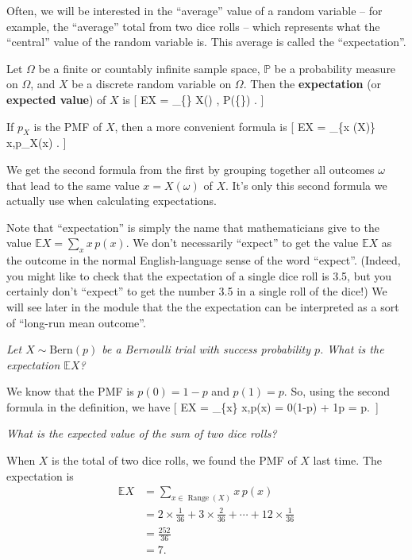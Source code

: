 \documentclass[
  letterpaper,
]{report}
\theoremstyle{definition}
\theoremstyle{definition}
\theoremstyle{remark}
\begin{document}
Often, we will be interested in the ``average'' value of a random
variable -- for example, the ``average'' total from two dice rolls --
which represents what the ``central'' value of the random variable is.
This average is called the ``expectation''.

Let \(\Omega\) be a finite or countably infinite sample space,
\(\mathbb P\) be a probability measure on \(\Omega\), and \(X\) be a
discrete random variable on \(\Omega\). Then the \textbf{expectation}
(or \textbf{expected value}) of \(X\) is {[} \mathbb EX =
\sum\_\{\omega \in \Omega\} X(\omega) , \mathbb P(\{\omega\}) . {]}

If \(p_X\) is the PMF of \(X\), then a more convenient formula is {[}
\mathbb EX = \sum\_\{x \in {}(X)\} x,p\_X(x) . {]}

We get the second formula from the first by grouping together all
outcomes \(\omega\) that lead to the same value \(x = X(\omega)\) of
\(X\). It's only this second formula we actually use when calculating
expectations.

Note that ``expectation'' is simply the name that mathematicians give to
the value \(\mathbb EX = \sum_x x\, p(x)\). We don't necessarily
``expect'' to get the value \(\mathbb EX\) as the outcome in the normal
English-language sense of the word ``expect''. (Indeed, you might like
to check that the expectation of a single dice roll is 3.5, but you
certainly don't ``expect'' to get the number 3.5 in a single roll of the
dice!) We will see later in the module that the the expectation can be
interpreted as a sort of ``long-run mean outcome''.

\emph{Let \(X \sim \text{Bern}(p)\) be a Bernoulli trial with success
probability \(p\). What is the expectation \(\mathbb EX\)?}

We know that the PMF is \(p(0) = 1- p\) and \(p(1) = p\). So, using the
second formula in the definition, we have {[} \mathbb EX = \sum\_\{x\}
x,p(x) = 0\times (1-p) + 1\times p = p.~{]}

\emph{What is the expected value of the sum of two dice rolls?}

When \(X\) is the total of two dice rolls, we found the PMF of \(X\)
last time. The expectation is \begin{align*}
  \mathbb EX &= \sum_{x \in \operatorname{Range}(X)} x\,p(x)  \\
    &= 2 \times \tfrac{1}{36} + 3 \times \tfrac{2}{36} + \cdots + 12 \times \tfrac{1}{36} \\
    &= \tfrac{252}{36} \\
    &= 7 .
\end{align*}
\end{document}
